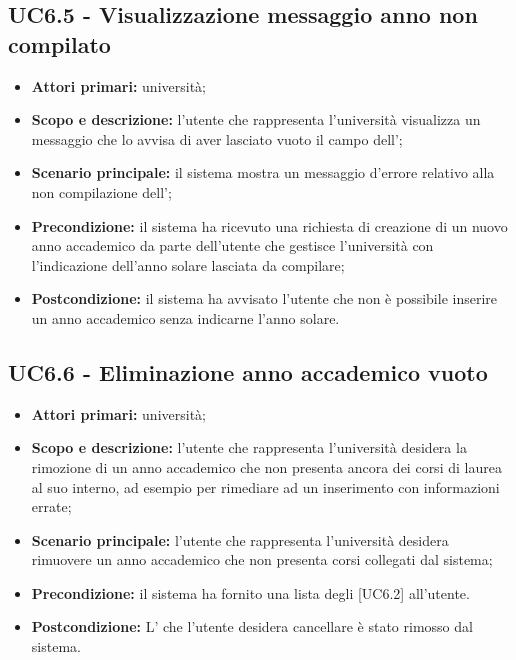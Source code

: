 \documentclass[AnalisiDeiRequisiti.tex]{subfiles}
\begin{document}
\subsection{UC6.5 - Visualizzazione messaggio anno non compilato}
\begin{itemize}
	\item \textbf{Attori primari:} università;
	\item \textbf{Scopo e descrizione:} l'utente che rappresenta l'università visualizza un messaggio che lo avvisa di aver lasciato vuoto il campo dell';
	\item \textbf{Scenario principale:} il sistema mostra un messaggio d'errore relativo alla non compilazione dell';
	\item \textbf{Precondizione:} il sistema ha ricevuto una richiesta di creazione di un nuovo anno accademico da parte dell'utente che gestisce l'università con l'indicazione dell'anno solare lasciata da compilare; 
	\item \textbf{Postcondizione:} il sistema ha avvisato l'utente che non è possibile inserire un anno accademico senza indicarne l'anno solare.
\end{itemize}
\subsection{UC6.6 - Eliminazione anno accademico vuoto}
\begin{itemize}
\item \textbf{Attori primari:} università;
\item \textbf{Scopo e descrizione:} l'utente che rappresenta l'università desidera la rimozione di un anno accademico che non presenta ancora dei corsi di laurea al suo interno, ad esempio per rimediare ad un inserimento con informazioni errate;
\item \textbf{Scenario principale:} l'utente che rappresenta l'università desidera rimuovere un anno accademico che non presenta corsi collegati dal sistema;
\item \textbf{Precondizione:} il sistema ha fornito una lista degli  [UC6.2] all'utente.
\item \textbf{Postcondizione:} L' che l'utente desidera cancellare è stato rimosso dal sistema.
\end{itemize}
\end{document}
